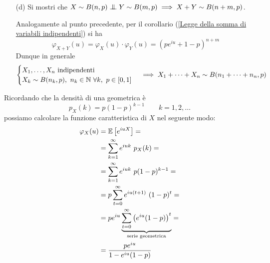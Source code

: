 \begin{enumerate}
\item [(d)] Si mostri che $X\sim B(n,p)\indep Y\sim B(m,p)\implies X+Y\sim B(n+m,p)$.

Analogamente al punto precedente, per il corollario (\ref{Legge della somma di variabili indipendenti}) si ha
\[
\varphi_{X+Y}(u)=\varphi_X(u)\cdot \varphi_Y(u)=\left(pe^{iu}+1-p\right)^{n+m}
\]
Dunque in generale
\[
\begin{cases}X_1,\dots,X_n\text{ indipendenti}\\X_k\sim B(n_k,p),\ n_k\in\NN\ \forall k,\ p\in[0,1]\end{cases} \implies X_1+\cdots+X_n\sim B(n_1+\cdots+n_n,p)
\]
\end{enumerate}

\Soluzione{} %
Ricordando che la densità di una geometrica è
\[
p_X(k)=p(1-p)^{k-1}\qquad k=1,2,\dots
\]
possiamo calcolare la funzione caratteristica di $X$ nel seguente modo:
\begin{gather*}
\begin{aligned}
\varphi_X(u)&=\mathbb{E}\left[e^{iuX}  \right]=\\
&=\sum_{k=1}^\infty e^{iuk}\ p_X(k)=\\
&=\sum_{k=1}^\infty e^{iuk}\ p(1-p)^{k-1}=\\
&=p\sum_{t=0}^\infty e^{iu(t+1)}\ (1-p)^{t}=\\
&=pe^{iu}\underbrace{\sum_{t=0}^\infty\left(e^{iu}(1-p)   \right)^t}_{\text{serie geometrica}}=\\
&=\frac{pe^{iu}}{1-e^{iu}(1-p)}
\end{aligned}
\end{gather*}

